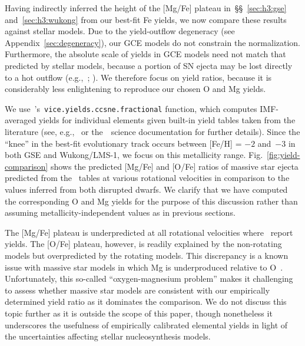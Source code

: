 \documentclass[foo.tex]{subfiles}
\begin{document}
{Having indirectly inferred the height of the [Mg/Fe] plateau
in~\S\S~\ref{sec:h3:gse} and~\ref{sec:h3:wukong} from our best-fit Fe yields,
we now compare these results against stellar models.
Due to the yield-outflow degeneracy (see Appendix~\ref{sec:degeneracy}), our
GCE models do not constrain the normalization.
Furthermore, the absolute scale of yields in GCE models need not match that
predicted by stellar models, because a portion of SN ejecta may be lost
directly to a hot outflow (e.g.,~\citealt*{Chisholm2018};
\citealt{Cameron2021}).
We therefore focus on yield ratios, because it is considerably less
enlightening to reproduce our chosen O and Mg yields.
\par
We use~\vice's~\texttt{vice.yields.ccsne.fractional} function, which computes
IMF-averaged yields for individual elements given built-in yield tables taken
from the literature (see, e.g.,~\citealt{Griffith2022} or the~\vice~science
documentation for further details).
Since the ``knee'' in the best-fit evolutionary track occurs between [Fe/H] =
$-2$ and~$-3$ in both GSE and Wukong/LMS-1, we focus on this metallicity range.
Fig.~\ref{fig:yield-comparison} shows the predicted [Mg/Fe] and [O/Fe] ratios
of massive star ejecta predicted from the~\citet{Limongi2018} tables at various
rotational velocities in comparison to the values inferred from both disrupted
dwarfs.
We clarify that we have computed the corresponding O and Mg yields for the
purpose of this discussion rather than assuming metallicity-independent
values as in previous sections.
\par
The [Mg/Fe] plateau is underpredicted at all rotational velocities
where~\citet{Limongi2018} report yields.
The [O/Fe] plateau, however, is readily explained by the non-rotating models
but overpredicted by the rotating models.
This discrepancy is a known issue with massive star models in which Mg is
underproduced relative to O~\citep[see discussion in][]{Griffith2022}.
Unfortunately, this so-called ``oxygen-magnesium problem'' makes it challenging
to assess whether massive star models are consistent with our empirically
determined yield ratio as it dominates the comparison.
We do not discuss this topic further as it is outside the scope of this paper,
though nonetheless it underscores the usefulness of empirically calibrated
elemental yields in light of the uncertainties affecting stellar
nucleosynthesis models.







}
\end{document}
